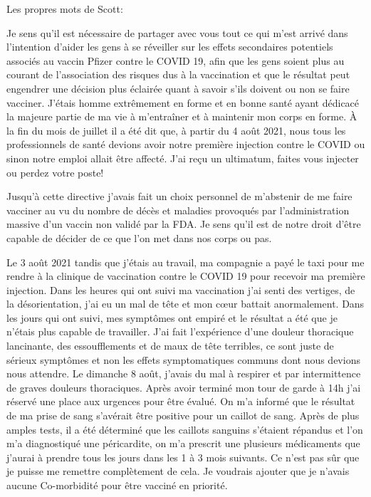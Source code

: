 Les propres mots de Scott:

Je sens qu’il est nécessaire de partager avec vous tout ce qui m’est arrivé dans
l’intention d’aider les gens à se réveiller sur les effets secondaires
potentiels associés au vaccin Pfizer contre le COVID 19, afin que les gens
soient plus au courant de l’association des risques dus à la vaccination et que
le résultat peut engendrer une décision plus éclairée quant à savoir s’ils
doivent ou non se faire vacciner. J’étais homme extrêmement en forme et en bonne
santé ayant dédicacé la majeure partie de ma vie à m’entraîner et à maintenir
mon corps en forme. À la fin du mois de juillet il a été dit que, à partir du 4
août 2021, nous tous les professionnels de santé devions avoir notre première
injection contre le COVID ou sinon notre emploi allait être affecté. J’ai reçu
un ultimatum, faites vous injecter ou perdez votre poste!

Jusqu’à cette directive j’avais fait un choix personnel de m’abstenir de me
faire vacciner au vu du nombre de décès et maladies provoqués par
l’administration massive d’un vaccin non validé par la FDA. Je sens qu’il est de
notre droit d’être capable de décider de ce que l’on met dans nos corps ou pas.

Le 3 août 2021 tandis que j’étais au travail, ma compagnie a payé le taxi pour
me rendre à la clinique de vaccination contre le COVID 19 pour recevoir ma
première injection. Dans les heures qui ont suivi ma vaccination j’ai senti des
vertiges, de la désorientation, j’ai eu un mal de tête et mon cœur battait
anormalement. Dans les jours qui ont suivi, mes symptômes ont empiré et le
résultat a été que je n’étais plus capable de travailler. J’ai fait l’expérience
d’une douleur thoracique lancinante, des essoufflements et de maux de tête
terribles, ce sont juste de sérieux symptômes et non les effets symptomatiques
communs dont nous devions nous attendre. Le dimanche 8 août, j’avais du mal à
respirer et par intermittence de graves douleurs thoraciques. Après avoir
terminé mon tour de garde à 14h j’ai réservé une place aux urgences pour être
évalué. On m’a informé que le résultat de ma prise de sang s’avérait être
positive pour un caillot de sang. Après de plus amples tests, il a été déterminé
que les caillots sanguins s’étaient répandus et l’on m’a diagnostiqué une
péricardite, on m’a prescrit une plusieurs médicaments que j’aurai à prendre
tous les jours dans les 1 à 3 mois suivants. Ce n’est pas sûr que je puisse me
remettre complètement de cela. Je voudrais ajouter que je n’avais aucune
Co-morbidité pour être vacciné en priorité.

